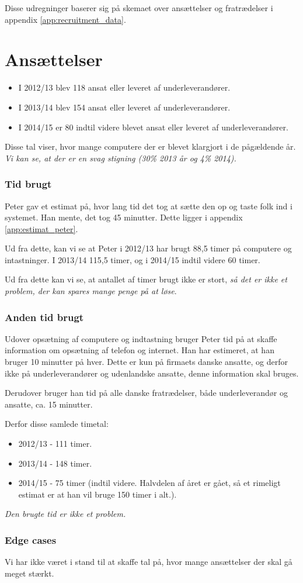 \label{app:cost_benefit_analysis}
Disse udregninger baserer sig på skemaet over ansættelser og fratrædelser i appendix \ref{app:recruitment_data}.

\section{Ansættelser}
\begin{itemize}
\item I 2012/13 blev 118 ansat eller leveret af underleverandører.
\item I 2013/14 blev 154 ansat eller leveret af underleverandører.
\item I 2014/15 er 80 indtil videre blevet ansat eller leveret af underleverandører.
\end{itemize}
Disse tal viser, hvor mange computere der er blevet klargjort i de pågældende år.
\emph{Vi kan se, at der er en svag stigning (30\% 2013 år og 4\% 2014).}

\subsubsection{Tid brugt}
Peter gav et estimat på, hvor lang tid det tog at sætte den op og taste folk ind i systemet.
Han mente, det tog 45 minutter.
Dette ligger i appendix \ref{app:estimat_peter}.

Ud fra dette, kan vi se at Peter i 2012/13 har brugt 88,5 timer på computere og intastninger.
I 2013/14 115,5 timer, og i 2014/15 indtil videre 60 timer.

Ud fra dette kan vi se, at antallet af timer brugt ikke er stort, \emph{så det er ikke et problem, der kan spares mange penge på at løse}.

\subsubsection{Anden tid brugt}
Udover opsætning af computere og indtastning bruger Peter tid på at skaffe information om opsætning af telefon og internet.
Han har estimeret, at han bruger 10 minutter på hver.
Dette er kun på firmaets danske ansatte, og derfor ikke på underleverandører og udenlandske ansatte, denne information skal bruges.

Derudover bruger han tid på alle danske fratrædelser, både underleverandør og ansatte, ca. 15 minutter.

Derfor disse samlede timetal:
\begin{itemize}
\item 2012/13 - 111 timer.
\item 2013/14 - 148 timer.
\item 2014/15 - 75 timer (indtil videre. Halvdelen af året er gået, så et rimeligt estimat er at han vil bruge 150 timer i alt.).
\end{itemize}

\emph{Den brugte tid er ikke et problem.}

\subsubsection{Edge cases}
Vi har ikke været i stand til at skaffe tal på, hvor mange ansættelser der skal gå meget stærkt.

